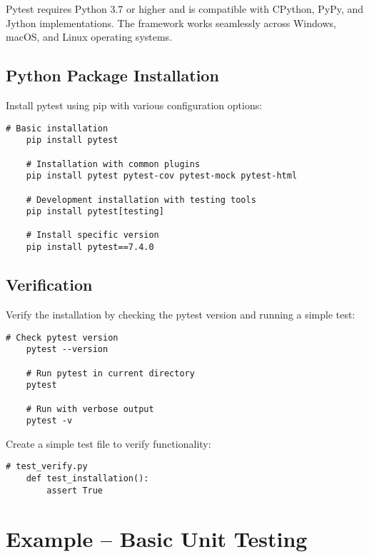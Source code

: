 Pytest requires Python 3.7 or higher and is compatible with CPython, PyPy, and Jython implementations. The framework works seamlessly across Windows, macOS, and Linux operating systems.

\subsection{Python Package Installation}
\label{subsec:python_install}

Install pytest using pip with various configuration options:

\begin{lstlisting}[style=bashstyle, caption={Pytest Installation}]
	# Basic installation
	pip install pytest
	
	# Installation with common plugins
	pip install pytest pytest-cov pytest-mock pytest-html
	
	# Development installation with testing tools
	pip install pytest[testing]
	
	# Install specific version
	pip install pytest==7.4.0
\end{lstlisting}

\subsection{Verification}
\label{subsec:verification}

Verify the installation by checking the pytest version and running a simple test:

\begin{lstlisting}[style=bashstyle, caption={Pytest Verification}]
	# Check pytest version
	pytest --version
	
	# Run pytest in current directory
	pytest
	
	# Run with verbose output
	pytest -v
\end{lstlisting}

Create a simple test file to verify functionality:

\begin{lstlisting}[language=MyPython, caption={Verification Test}]
	# test_verify.py
	def test_installation():
	    assert True
\end{lstlisting}

\section{Example -- Basic Unit Testing}
\label{sec:basic_example}

